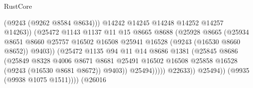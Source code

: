 \begin{lexlean}{RustCore}
\begin{coremodule}
                                            (@9243 (@9262 @8584 @8634)))
                                          @14242
                                          @14245
                                          @14248
                                          @14252
                                          @14257
                                          @14263))
                                      (@25472
                                        @1143
                                        @1137
                                        @11
                                        @15
                                        @8665
                                        @8688
                                        (@25928
                                          @8665
                                          (@25934
                                            @8651
                                            @8660
                                            @25757
                                            @16502
                                            @16508
                                            @25941
                                            @16528
                                            (@9243 (@16530 @8660 @8652))
                                            @9403))
                                        (@25472
                                          @1135
                                          @94
                                          @11
                                          @14
                                          @8686
                                          @1381
                                          (@25845
                                            @8686
                                            (@25849
                                              @8328
                                              @4006
                                              @8671
                                              @8681
                                              @25491
                                              @16502
                                              @16508
                                              @25858
                                              @16528
                                              (@9243 (@16530 @8681 @8672))
                                              @9403))
                                          @25494)))))
                                @22633))
                            @25494))
                        (@9935 (@9938 @1075 @1511))))
                    (@26016

\end{coremodule}
\end{lexlean}
